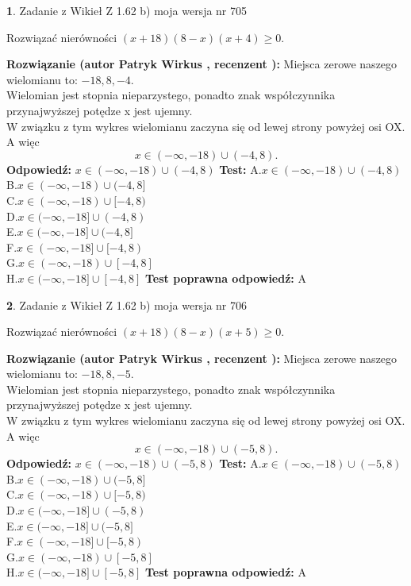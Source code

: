 \documentclass[12pt, a4paper]{article}
\theoremstyle{definition} %
\newtheorem{zad}{}
\newcommand{\zadStart}[1]{\begin{zad}#1\newline}
\newcommand{\zadStop}{\end{zad}}
\newcommand{\rozwStart}[2]{\noindent \textbf{Rozwiązanie (autor #1 , recenzent #2): }\newline}
\newcommand{\rozwStop}{\newline}
\newcommand{\odpStart}{\noindent \textbf{Odpowiedź:}\newline}
\newcommand{\odpStop}{\newline}
\newcommand{\testStart}{\noindent \textbf{Test:}\newline}
\newcommand{\testStop}{\newline}
\newcommand{\kluczStart}{\noindent \textbf{Test poprawna odpowiedź:}\newline}
\newcommand{\kluczStop}{\newline}
\begin{document}
\zadStart{Zadanie z Wikieł Z 1.62 b) moja wersja nr 705}

Rozwiązać nierówności $(x+18)(8-x)(x+4)\ge0$.
\zadStop
\rozwStart{Patryk Wirkus}{}
Miejsca zerowe naszego wielomianu to: $-18, 8, -4$.\\
Wielomian jest stopnia nieparzystego, ponadto znak współczynnika przy\linebreak najwyższej potędze x jest ujemny.\\ W związku z tym wykres wielomianu zaczyna się od lewej strony powyżej osi OX. A więc $$x \in (-\infty,-18) \cup (-4,8).$$
\rozwStop
\odpStart
$x \in (-\infty,-18) \cup (-4,8)$
\odpStop
\testStart
A.$x \in (-\infty,-18) \cup (-4,8)$\\
B.$x \in (-\infty,-18) \cup (-4,8]$\\
C.$x \in (-\infty,-18) \cup [-4,8)$\\
D.$x \in (-\infty,-18] \cup (-4,8)$\\
E.$x \in (-\infty,-18] \cup (-4,8]$\\
F.$x \in (-\infty,-18] \cup [-4,8)$\\
G.$x \in (-\infty,-18) \cup [-4,8]$\\
H.$x \in (-\infty,-18] \cup [-4,8]$
\testStop
\kluczStart
A
\kluczStop



\zadStart{Zadanie z Wikieł Z 1.62 b) moja wersja nr 706}

Rozwiązać nierówności $(x+18)(8-x)(x+5)\ge0$.
\zadStop
\rozwStart{Patryk Wirkus}{}
Miejsca zerowe naszego wielomianu to: $-18, 8, -5$.\\
Wielomian jest stopnia nieparzystego, ponadto znak współczynnika przy\linebreak najwyższej potędze x jest ujemny.\\ W związku z tym wykres wielomianu zaczyna się od lewej strony powyżej osi OX. A więc $$x \in (-\infty,-18) \cup (-5,8).$$
\rozwStop
\odpStart
$x \in (-\infty,-18) \cup (-5,8)$
\odpStop
\testStart
A.$x \in (-\infty,-18) \cup (-5,8)$\\
B.$x \in (-\infty,-18) \cup (-5,8]$\\
C.$x \in (-\infty,-18) \cup [-5,8)$\\
D.$x \in (-\infty,-18] \cup (-5,8)$\\
E.$x \in (-\infty,-18] \cup (-5,8]$\\
F.$x \in (-\infty,-18] \cup [-5,8)$\\
G.$x \in (-\infty,-18) \cup [-5,8]$\\
H.$x \in (-\infty,-18] \cup [-5,8]$
\testStop
\kluczStart
A
\kluczStop
\end{document}
